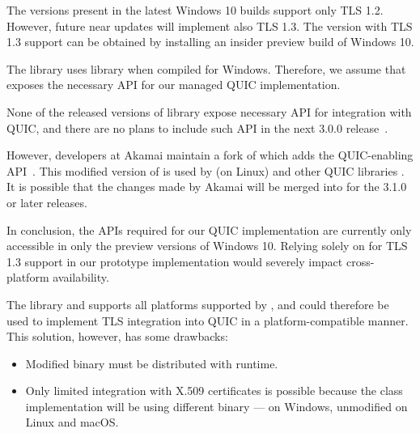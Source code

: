 \begin{description}

     The \libschannel{} versions present in the latest Windows 10
    builds support only TLS 1.2.  However, future near updates will implement also TLS 1.3. The
    \libschannel{} version with TLS 1.3 support can be obtained by installing an insider preview
    build of Windows 10.

    The \libmsquic{} library uses \libschannel{} library when compiled for Windows. Therefore, we
    assume that \libschannel{} exposes the necessary API for our managed QUIC implementation.

    \ditem{\libopenssl{}}
    None of the released versions of \libopenssl{} library expose necessary API for integration
    with QUIC, and there are no plans to include such API in the next \libopenssl{} 3.0.0
    release~\cite{OpensslBlogNoQuic}.

    However, developers at Akamai maintain a fork of \libopenssl{} which adds the QUIC-enabling
    API~\cite{AkamaiOpensslGithub}. This modified version of \libopenssl{} is used by \libmsquic{}
    (on Linux) and other QUIC libraries . It is possible
    that the changes made by Akamai will be merged into \libopenssl{} for the 3.1.0 or later
    releases.

\end{description}

In conclusion, the APIs required for our QUIC implementation are currently only accessible in only
the preview versions of Windows 10. Relying solely on \libschannel{} for TLS 1.3 support in our
prototype implementation would severely impact cross-platform availability.

The \libopenssl{} library and supports all platforms supported by \dotnet{}, and could therefore be
used to implement TLS integration into QUIC in a platform-compatible manner. This solution, however,
has some drawbacks:


\begin{itemize}

  \item Modified \libopenssl{} binary must be distributed with \dotnet{} runtime.

  \item Only limited integration with X.509 certificates is possible because the
     class implementation will be using different binary ---
     on Windows, unmodified \libopenssl{} on Linux and macOS.

\end{itemize}

